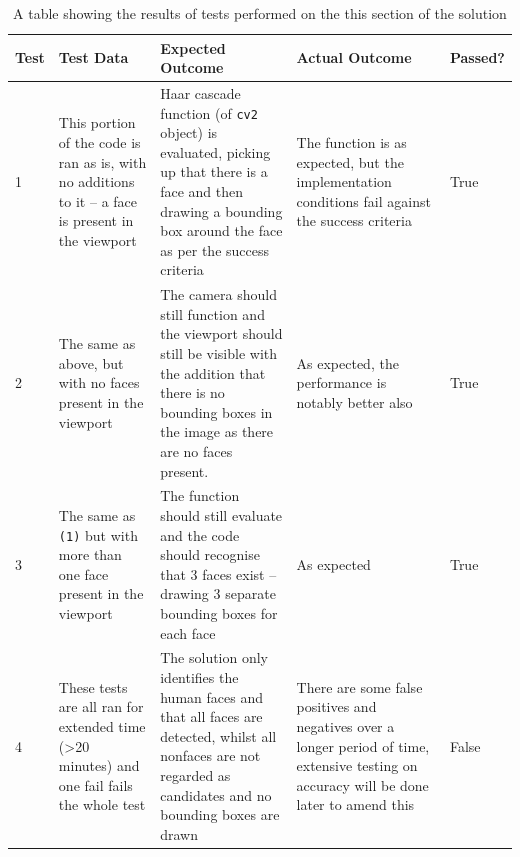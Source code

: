 \documentclass[9pt]{article}
\begin{document}
\begin{table}[H]        
	\centering             
	\begin{tabularx}{\textwidth}{lXXXl}
		\textbf{Test} & \textbf{Test Data}                                                                                  & \textbf{Expected Outcome}                                                                                                                                                & \textbf{Actual Outcome}                                                                                                                   & \textbf{Passed?} \\
		\midrule
		1             & This portion of the code is ran as is, with no additions to it -- a face is present in the viewport & Haar cascade function (of \texttt{cv2} object) is evaluated, picking up that there is a face and then drawing a bounding box around the face as per the success criteria & The function is as expected, but the implementation conditions fail against the success criteria                                          & True             \\
		2             & The same as above, but with no faces present in the viewport                                        & The camera should still function and the viewport should still be visible with the addition that there is no bounding boxes in the image as there are no faces present.  & As expected, the performance is notably better also                                                                                       & True             \\
		3             & The same as \texttt{(1)} but with more than one face present in the viewport                        & The function should still evaluate and the code should recognise that 3 faces exist -- drawing 3 separate bounding boxes for each face                                   & As expected                                                                                                                               & True             \\
		4             & These tests are all ran for extended time (>20 minutes) and one fail fails the whole test           & The solution only identifies the
		human faces and that all faces
		are detected, whilst all nonfaces are not regarded as candidates and no bounding boxes are
		drawn   & There are some false positives and negatives over a longer period of time, extensive testing on accuracy will be done later to amend this & False            \\
		\bottomrule
	\end{tabularx}
	\caption{A table showing the results of tests performed on the this section of the solution}
	\label{tab_testingCameraTest}
\end{table}
\end{document}
